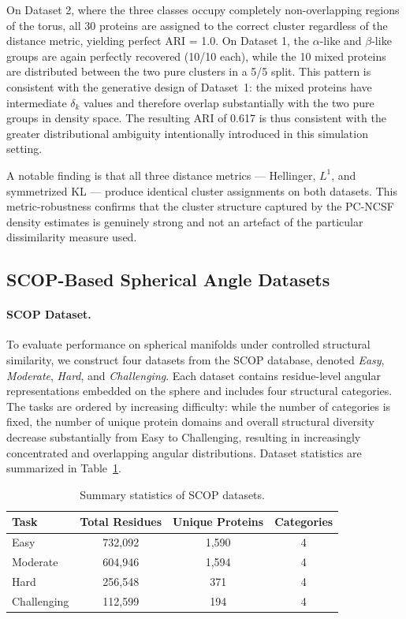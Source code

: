 \documentclass{article}
\begin{document}
On Dataset 2, where the three classes occupy completely non-overlapping
regions of the torus, all 30 proteins are assigned to the correct cluster
regardless of the distance metric, yielding perfect ARI = 1.0.
On Dataset 1, the $\alpha$-like and $\beta$-like groups are again perfectly
recovered (10/10 each), while the 10 mixed proteins are distributed between
the two pure clusters in a 5/5 split.
{\color{red}
This pattern is consistent with the generative design of Dataset~1: the mixed proteins have intermediate $\delta_k$ values and therefore
overlap substantially with the two pure groups in density space. The resulting ARI of 0.617 is thus consistent with the greater distributional ambiguity intentionally introduced in this simulation setting.
}

A notable finding is that all three distance metrics — Hellinger, $L^1$,
and symmetrized KL — produce identical cluster assignments on both datasets.
This metric-robustness confirms that the cluster structure captured by
the PC-NCSF density estimates is genuinely strong and not an artefact
of the particular dissimilarity measure used.


\subsection{SCOP-Based Spherical Angle Datasets}

\paragraph{SCOP Dataset.}
To evaluate performance on spherical manifolds under controlled structural similarity, we construct four datasets from the SCOP database, denoted \emph{Easy}, \emph{Moderate}, \emph{Hard}, and \emph{Challenging}. Each dataset contains residue-level angular representations embedded on the sphere and includes four structural categories.
The tasks are ordered by increasing difficulty: while the number of categories is fixed, the number of unique protein domains and overall structural diversity decrease substantially from Easy to Challenging, resulting in increasingly concentrated and overlapping angular distributions. Dataset statistics are summarized in Table~\ref{tab:scop_summary}.

\begin{table}[t]
\centering
\caption{Summary statistics of \textsc{SCOP} datasets.}
\label{tab:scop_summary}
\begin{tabular}{lccc}
\toprule
Task & Total Residues & Unique Proteins & Categories \\
\midrule
Easy        & 732,092 & 1,590 & 4 \\
Moderate    & 604,946 & 1,594 & 4 \\
Hard        & 256,548 &   371 & 4 \\
Challenging & 112,599 &   194 & 4 \\
\bottomrule
\end{tabular}
\end{table}
\end{document}

